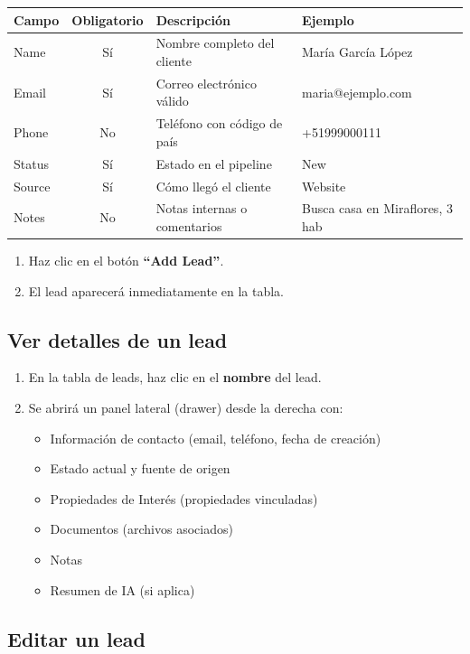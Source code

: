 \documentclass[12pt,oneside]{article}
\begin{document}
\begin{tabularx}{\textwidth}{|X|c|X|X|}
\hline
\rowcolor{primary!10}
\textbf{Campo} & \textbf{Obligatorio} & \textbf{Descripción} & \textbf{Ejemplo} \\
\hline
Name & Sí & Nombre completo del cliente & María García López \\
\hline
Email & Sí & Correo electrónico válido & maria@ejemplo.com \\
\hline
Phone & No & Teléfono con código de país & +51999000111 \\
\hline
Status & Sí & Estado en el pipeline & New \\
\hline
Source & Sí & Cómo llegó el cliente & Website \\
\hline
Notes & No & Notas internas o comentarios & Busca casa en Miraflores, 3 hab \\
\hline
\end{tabularx}

\begin{enumerate}[leftmargin=*, start=3]
  \item Haz clic en el botón \textbf{“Add Lead”}.
  \item El lead aparecerá inmediatamente en la tabla.
\end{enumerate}

\subsection{Ver detalles de un lead}

\begin{enumerate}[leftmargin=*]
  \item En la tabla de leads, haz clic en el \textbf{nombre} del lead.
  \item Se abrirá un panel lateral (drawer) desde la derecha con:
  \begin{itemize}
    \item Información de contacto (email, teléfono, fecha de creación)
    \item Estado actual y fuente de origen
    \item Propiedades de Interés (propiedades vinculadas)
    \item Documentos (archivos asociados)
    \item Notas
    \item Resumen de IA (si aplica)
  \end{itemize}
\end{enumerate}

\subsection{Editar un lead}
\end{document}
